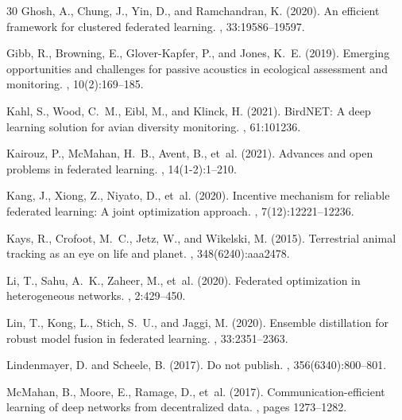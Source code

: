 \begin{thebibliography}{30}
Ghosh, A., Chung, J., Yin, D., and Ramchandran, K. (2020).
\newblock An efficient framework for clustered federated learning.
, 33:19586--19597.

Gibb, R., Browning, E., Glover-Kapfer, P., and Jones, K.~E. (2019).
\newblock Emerging opportunities and challenges for passive acoustics in ecological assessment and monitoring.
, 10(2):169--185.

Kahl, S., Wood, C.~M., Eibl, M., and Klinck, H. (2021).
\newblock BirdNET: A deep learning solution for avian diversity monitoring.
, 61:101236.

Kairouz, P., McMahan, H.~B., Avent, B., et~al. (2021).
\newblock Advances and open problems in federated learning.
, 14(1-2):1--210.

Kang, J., Xiong, Z., Niyato, D., et~al. (2020).
\newblock Incentive mechanism for reliable federated learning: A joint optimization approach.
, 7(12):12221--12236.

Kays, R., Crofoot, M.~C., Jetz, W., and Wikelski, M. (2015).
\newblock Terrestrial animal tracking as an eye on life and planet.
, 348(6240):aaa2478.

Li, T., Sahu, A.~K., Zaheer, M., et~al. (2020).
\newblock Federated optimization in heterogeneous networks.
, 2:429--450.

Lin, T., Kong, L., Stich, S.~U., and Jaggi, M. (2020).
\newblock Ensemble distillation for robust model fusion in federated learning.
, 33:2351--2363.

Lindenmayer, D. and Scheele, B. (2017).
\newblock Do not publish.
, 356(6340):800--801.

McMahan, B., Moore, E., Ramage, D., et~al. (2017).
\newblock Communication-efficient learning of deep networks from decentralized data.
, pages 1273--1282.


\end{thebibliography}
